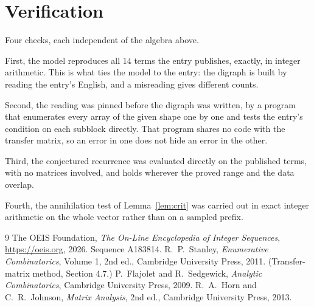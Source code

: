 \documentclass[11pt,a4paper]{article}
\theoremstyle{plain}
\theoremstyle{definition}
\begin{document}
\section{Verification}

Four checks, each independent of the algebra above.

First, the model reproduces all $14$ terms the entry publishes, exactly, in integer
arithmetic. This is what ties the model to the entry: the digraph is built by reading the
entry's English, and a misreading gives different counts.

Second, the reading was pinned before the digraph was written, by a program that enumerates
every array of the given shape one by one and tests the entry's condition on each subblock
directly. That program shares no code with the transfer matrix, so an error in one does not
hide an error in the other.

Third, the conjectured recurrence was evaluated directly on the published terms, with no
matrices involved, and holds wherever the proved range and the data overlap.

Fourth, the annihilation test of Lemma~\ref{lem:crit} was carried out in exact integer
arithmetic on the whole vector rather than on a sampled prefix.

\begin{thebibliography}{9}
 The OEIS Foundation, \emph{The On-Line Encyclopedia of Integer
Sequences}, \url{https://oeis.org}, 2026. Sequence A183814.
 R.~P.~Stanley, \emph{Enumerative Combinatorics}, Volume 1, 2nd ed.,
Cambridge University Press, 2011. (Transfer-matrix method, Section 4.7.)
 P.~Flajolet and R.~Sedgewick, \emph{Analytic Combinatorics}, Cambridge
University Press, 2009.
 R.~A.~Horn and C.~R.~Johnson, \emph{Matrix Analysis}, 2nd ed., Cambridge
University Press, 2013.
\end{thebibliography}
\end{document}
